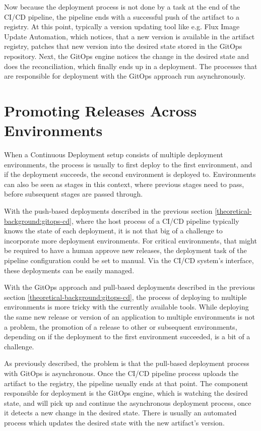 Now because the deployment process is not done by a task at the end of the CI/CD pipeline,
the pipeline ends with a successful push of the artifact to a registry.
At this point, typically a version updating tool like e.g. Flux Image Update Automation, which notices, that a new version is available in
the artifact registry, patches that new version into the desired state stored in the GitOps repository.
Next, the GitOps engine notices the change in the desired state and does the reconciliation,
which finally ends up in a deployment.
The processes that are responsible for deployment with the GitOps approach run asynchronously.










\section{Promoting Releases Across Environments}

When a Continuous Deployment setup consists of multiple deployment environments,
the process is usually to first deploy to the first environment,
and if the deployment succeeds, the second environment is deployed to.
Environments can also be seen as stages in this context,
where previous stages need to pass, before subsequent stages are passed through.

With the push-based deployments described in the previous section \ref{theoretical-background:gitops-cd},
where the host process of a CI/CD pipeline typically knows the state of each deployment,
it is not that big of a challenge to incorporate more deployment environments.
For critical environments, that might be required to have a human approve new releases,
the deployment task of the pipeline configuration could be set to manual.
Via the CI/CD system's interface, these deployments can be easily managed.

With the GitOps approach and pull-based deployments described in the previous section \ref{theoretical-background:gitops-cd},
the process of deploying to multiple environments is more tricky with the currently available tools.
While deploying the same new release or version of an application to multiple environments is not a problem,
the promotion of a release to other or subsequent environments, depending on if the deployment to the first environment succeeded,
is a bit of a challenge.

As previously described, the problem is that the pull-based deployment process with GitOps is asynchronous.
Once the CI/CD pipeline process uploads the artifact to the registry, the pipeline usually ends at that point.
The component responsible for deployment is the GitOps engine, which is watching the desired state,
and will pick up and continue the asynchronous deployment process, once it detects a new change in the desired state.
There is usually an automated process which updates the desired state with the new artifact's version.

